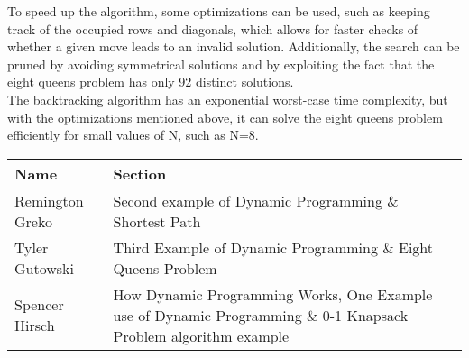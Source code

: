 \documentclass{article}
\begin{document}
To speed up the algorithm, some optimizations can be used, such as keeping track of the
occupied rows and diagonals, which allows for faster checks of whether a given move
leads to an invalid solution. Additionally, the search can be pruned by avoiding symmetrical
solutions and by exploiting the fact that the eight queens problem has only 92 distinct solutions.\\

The backtracking algorithm has an exponential worst-case time complexity, but with the
optimizations mentioned above, it can solve the eight queens problem efficiently for small
values of N, such as N=8.



\bigskip

\pagebreak

\begin{center}
        \begin{tabular}{|p{3cm}|p{6cm}|}
            \hline
            \textbf{Name} & \textbf{Section} \\
            \hline
            Remington Greko & Second example of Dynamic Programming $\&$ Shortest Path\\
            \hline
            Tyler Gutowski & Third Example of Dynamic Programming $\&$ Eight Queens Problem\\
            \hline
            Spencer Hirsch & How Dynamic Programming Works, One Example use of Dynamic Programming $\&$ 0-1 Knapsack Problem algorithm example \\
            \hline
        \end{tabular}
    \end{center}
    
\end{document}
